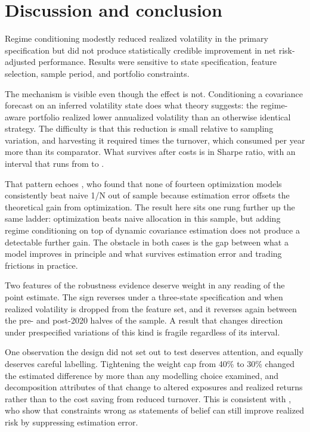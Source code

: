 \documentclass[11pt,letterpaper]{article}
\begin{document}


\section{Discussion and conclusion}
\label{sec:conclusion}

Regime conditioning modestly reduced realized volatility in the primary
specification but did not produce statistically credible improvement in
net risk-adjusted performance. Results were sensitive to state
specification, feature selection, sample period, and portfolio
constraints.

The mechanism is visible even though the effect is not. Conditioning a
covariance forecast on an inferred volatility state does what theory
suggests: the regime-aware portfolio realized \volDifferenceMagnitude{}
lower annualized volatility than an otherwise identical strategy. The
difficulty is that this reduction is small relative to sampling
variation, and harvesting it required \turnoverRatio{} times the
turnover, which consumed \costHurdle{} per year more than its comparator.
What survives after costs is
\primarySharpeDiff{} in Sharpe ratio, with an interval that runs from
\primaryCiLower{} to \primaryCiUpper{}.

That pattern echoes \citet{demiguel2009}, who found that none of
fourteen optimization models consistently beat naive 1/N out of sample
because estimation error offsets the theoretical gain from
optimization. The result here sits one rung further up the same ladder:
optimization beats naive allocation in this sample, but adding regime
conditioning on top of dynamic covariance estimation does not produce a
detectable further gain. The obstacle in both cases is the gap between
what a model improves in principle and what survives estimation error
and trading frictions in practice.

Two features of the robustness evidence deserve weight in any reading of
the point estimate. The sign reverses under a three-state specification
and when realized volatility is dropped from the feature set, and it
reverses again between the pre- and post-2020 halves of the sample. A
result that changes direction under prespecified variations of this
kind is fragile regardless of its interval.

One observation the design did not set out to test deserves attention,
and equally deserves careful labelling. Tightening the weight cap from
40\% to 30\% changed the estimated difference by more than any modelling
choice examined, and decomposition attributes \capThirtyGrossShare{} of
that change to altered exposures and realized returns rather than to the
cost saving from reduced turnover. This is consistent with
\citet{jagannathan2003}, who show that constraints wrong as statements
of belief can still improve realized risk by suppressing estimation
error.
\end{document}
